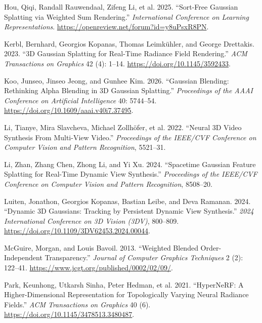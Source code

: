 \documentclass[
]{article}
\newlength{\cslhangindent}
\newenvironment{CSLReferences}[2] %
 {\begin{list}{}{%
  \setlength{\itemindent}{0pt}
  \setlength{\leftmargin}{0pt}
  \setlength{\parsep}{0pt}
  \ifodd #1
   \setlength{\leftmargin}{\cslhangindent}
   \setlength{\itemindent}{-1\cslhangindent}
  \fi
  \setlength{\itemsep}{#2\baselineskip}}}
 {\end{list}}
\begin{document}
\protect{}\label{refs}
\begin{CSLReferences}{1}{1}
Hou, Qiqi, Randall Rauwendaal, Zifeng Li, et al. 2025. {``{Sort-Free
Gaussian Splatting via Weighted Sum Rendering}.''} \emph{International
Conference on Learning Representations}.
\url{https://openreview.net/forum?id=y8uPsxR8PN}.

Kerbl, Bernhard, Georgios Kopanas, Thomas Leimkühler, and George
Drettakis. 2023. {``{3D Gaussian Splatting for Real-Time Radiance Field
Rendering}.''} \emph{ACM Transactions on Graphics} 42 (4): 1--14.
\url{https://doi.org/10.1145/3592433}.

Koo, Junseo, Jinseo Jeong, and Gunhee Kim. 2026. {``{Gaussian Blending:
Rethinking Alpha Blending in 3D Gaussian Splatting}.''}
\emph{Proceedings of the AAAI Conference on Artificial Intelligence} 40:
5744--54. \url{https://doi.org/10.1609/aaai.v40i7.37495}.

Li, Tianye, Mira Slavcheva, Michael Zollhöfer, et al. 2022. {``{Neural
3D Video Synthesis From Multi-View Video}.''} \emph{Proceedings of the
IEEE/CVF Conference on Computer Vision and Pattern Recognition},
5521--31.

Li, Zhan, Zhang Chen, Zhong Li, and Yi Xu. 2024. {``{Spacetime Gaussian
Feature Splatting for Real-Time Dynamic View Synthesis}.''}
\emph{Proceedings of the IEEE/CVF Conference on Computer Vision and
Pattern Recognition}, 8508--20.

Luiten, Jonathon, Georgios Kopanas, Bastian Leibe, and Deva Ramanan.
2024. {``{Dynamic 3D Gaussians: Tracking by Persistent Dynamic View
Synthesis}.''} \emph{2024 International Conference on 3D Vision (3DV)},
800--809. \url{https://doi.org/10.1109/3DV62453.2024.00044}.

McGuire, Morgan, and Louis Bavoil. 2013. {``{Weighted Blended
Order-Independent Transparency}.''} \emph{Journal of Computer Graphics
Techniques} 2 (2): 122--41.
\url{https://www.jcgt.org/published/0002/02/09/}.

Park, Keunhong, Utkarsh Sinha, Peter Hedman, et al. 2021. {``{HyperNeRF:
A Higher-Dimensional Representation for Topologically Varying Neural
Radiance Fields}.''} \emph{ACM Transactions on Graphics} 40 (6).
\url{https://doi.org/10.1145/3478513.3480487}.


\end{CSLReferences}
\end{document}
